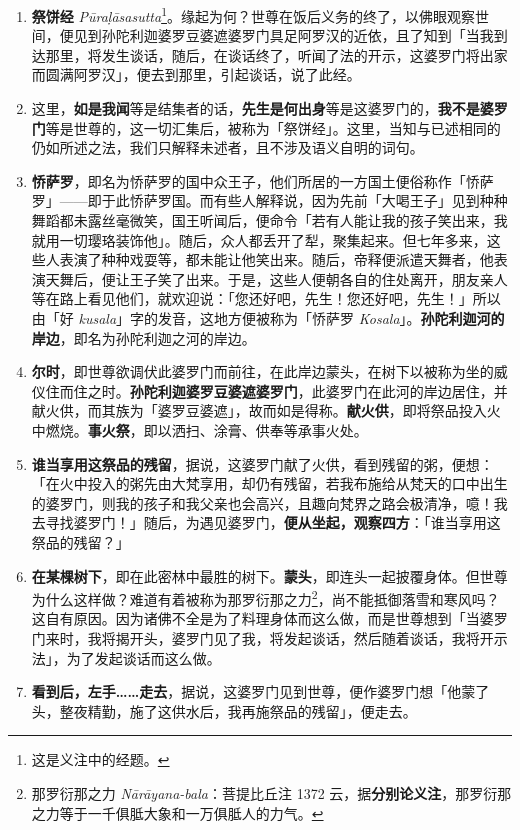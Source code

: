 \begin{enumerate}\item \textbf{祭饼经} \textit{Pūraḷāsasutta}\footnote{这是义注中的经题。}。缘起为何？世尊在饭后义务的终了，以佛眼观察世间，便见到孙陀利迦婆罗豆婆遮婆罗门具足阿罗汉的近依，且了知到「当我到达那里，将发生谈话，随后，在谈话终了，听闻了法的开示，这婆罗门将出家而圆满阿罗汉」，便去到那里，引起谈话，说了此经。
\item 这里，\textbf{如是我闻}等是结集者的话，\textbf{先生是何出身}等是这婆罗门的，\textbf{我不是婆罗门}等是世尊的，这一切汇集后，被称为「祭饼经」。这里，当知与已述相同的仍如所述之法，我们只解释未述者，且不涉及语义自明的词句。
\item \textbf{㤭萨罗}，即名为㤭萨罗的国中众王子，他们所居的一方国土便俗称作「㤭萨罗」——即于此㤭萨罗国。而有些人解释说，因为先前「大喝王子」见到种种舞蹈都未露丝毫微笑，国王听闻后，便命令「若有人能让我的孩子笑出来，我就用一切璎珞装饰他」。随后，众人都丢开了犁，聚集起来。但七年多来，这些人表演了种种戏耍等，都未能让他笑出来。随后，帝释便派遣天舞者，他表演天舞后，便让王子笑了出来。于是，这些人便朝各自的住处离开，朋友亲人等在路上看见他们，就欢迎说：「您还好吧，先生！您还好吧，先生！」所以由「好 \textit{kusala}」字的发音，这地方便被称为「㤭萨罗 \textit{Kosala}」。\textbf{孙陀利迦河的岸边}，即名为孙陀利迦之河的岸边。
\item \textbf{尔时}，即世尊欲调伏此婆罗门而前往，在此岸边蒙头，在树下以被称为坐的威仪住而住之时。\textbf{孙陀利迦婆罗豆婆遮婆罗门}，此婆罗门在此河的岸边居住，并献火供，而其族为「婆罗豆婆遮」，故而如是得称。\textbf{献火供}，即将祭品投入火中燃烧。\textbf{事火祭}，即以洒扫、涂膏、供奉等承事火处。
\item \textbf{谁当享用这祭品的残留}，据说，这婆罗门献了火供，看到残留的粥，便想：「在火中投入的粥先由大梵享用，却仍有残留，若我布施给从梵天的口中出生的婆罗门，则我的孩子和我父亲也会高兴，且趣向梵界之路会极清净，噫！我去寻找婆罗门！」随后，为遇见婆罗门，\textbf{便从坐起，观察四方}：「谁当享用这祭品的残留？」
\item \textbf{在某棵树下}，即在此密林中最胜的树下。\textbf{蒙头}，即连头一起披覆身体。但世尊为什么这样做？难道有着被称为那罗衍那之力\footnote{那罗衍那之力 \textit{Nārāyana-bala}：菩提比丘注 1372 云，据\textbf{分别论义注}，那罗衍那之力等于一千俱胝大象和一万俱胝人的力气。}，尚不能抵御落雪和寒风吗？这自有原因。因为诸佛不全是为了料理身体而这么做，而是世尊想到「当婆罗门来时，我将揭开头，婆罗门见了我，将发起谈话，然后随着谈话，我将开示法」，为了发起谈话而这么做。
\item \textbf{看到后，左手……走去}，据说，这婆罗门见到世尊，便作婆罗门想「他蒙了头，整夜精勤，施了这供水后，我再施祭品的残留」，便走去。\end{enumerate}

